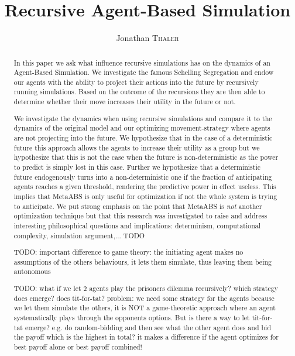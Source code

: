 \documentclass[a4paper, 10pt, conference]{IEEEtran}
\title{Recursive Agent-Based Simulation} %
\author{Jonathan \textsc{Thaler}} %
\begin{document}
\maketitle %

\begin{abstract}
In this paper we ask what influence recursive simulations has on the dynamics of an Agent-Based Simulation. We investigate the famous Schelling Segregation and endow our agents with the ability to project their actions into the future by recursively running simulations. Based on the outcome of the recursions they are then able to determine whether their move increases their utility in the future or not.

We investigate the dynamics when using recursive simulations and compare it to the dynamics of the original model and our optimizing movement-strategy where agents are not projecting into the future. We hypothesize that in the case of a deterministic future this approach allows the agents to increase their utility as a group but we hypothesize that this is not the case when the future is non-deterministic as the power to predict is simply lost in this case.  Further we hypothesize that a deterministic future endogenously turns into a non-deterministic one if the fraction of anticipating agents reaches a given threshold, rendering the predictive power in effect useless. This implies that MetaABS is only useful for optimization if not the whole system is trying to anticipate. 
We put strong emphasis on the point that MetaABS is \textit{not} another optimization technique but that this research was investigated to raise and address interesting philosophical questions and implications: determinism, computational complexity, simulation argument,... TODO

TODO: important difference to game theory: the initiating agent makes no assumptions of the others behaviours, it lets them simulate, thus leaving them being autonomous

TODO:  what if we let 2 agents play the prisoners dilemma recursively? which strategy does emerge? does tit-for-tat? problem: we need some strategy for the agents because we let them simulate the others, it is NOT a game-theoretic approach where an agent systematically plays through the opponents options. But is there a way to let tit-for-tat emerge? e.g. do random-bidding and then see what the other agent does and bid the payoff which is the highest in total? it makes a difference if the agent optimizes for best payoff alone or best payoff combined!


\end{abstract}
\end{document}
